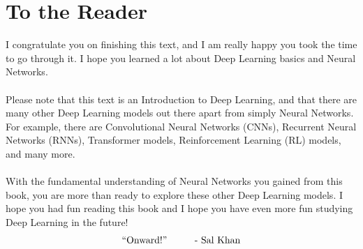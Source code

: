 \documentclass{article}
\begin{document}
\section*{To the Reader}
I congratulate you on finishing this text, and I am really happy you took the time to go through it. I hope you learned a lot about Deep Learning basics and Neural Networks.
\\
\\
Please note that this text is an Introduction to Deep Learning, and that there are many other Deep Learning models out there apart from simply Neural Networks. For example, there are Convolutional Neural Networks (CNNs), Recurrent Neural Networks (RNNs), Transformer models, Reinforcement Learning (RL) models, and many more.
\\
\\
With the fundamental understanding of Neural Networks you gained from this book, you are more than ready to explore these other Deep Learning models. I hope you had fun reading this book and I hope you have even more fun studying Deep Learning in the future!
\[\text{``Onward!''}\hspace{10mm}\text{- Sal Khan}\]
\end{document}
